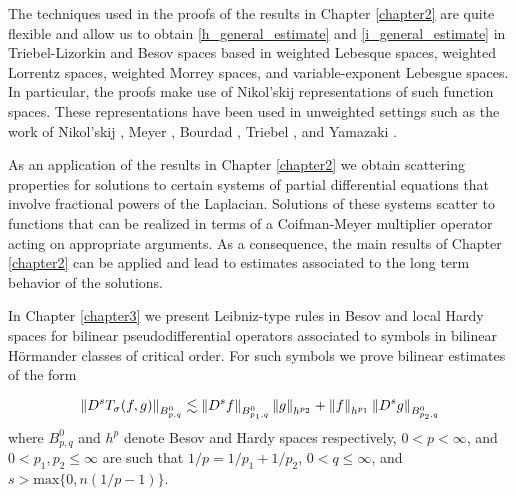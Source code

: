 The techniques used in the proofs of the results in Chapter \ref{chapter2} are quite flexible and allow us to obtain \eqref{h_general_estimate} and \eqref{i_general_estimate} in Triebel-Lizorkin and Besov spaces based in weighted Lebesque spaces, weighted Lorrentz spaces, weighted Morrey spaces, and variable-exponent Lebesgue spaces.
In particular, the proofs make use of Nikol'skij representations of such function spaces. These representations have been used in unweighted settings such as the work of Nikol'skij \citep{MR0374877}, Meyer \citep{MR639462}, Bourdad \citep{MR673825}, Triebel \citep{MR3024598}, and Yamazaki \citep{MR837335}. 

As an application of the results in Chapter \ref{chapter2} we obtain scattering properties for solutions to certain systems of partial differential equations that involve fractional powers of the Laplacian. Solutions of these systems scatter to functions that can be realized in terms of a Coifman-Meyer multiplier operator acting on appropriate arguments. As a consequence, the main results of Chapter \ref{chapter2} can be applied and lead to estimates associated to the long term behavior of the solutions. 

In Chapter \ref{chapter3} we present Leibniz-type rules in Besov and local Hardy spaces for bilinear pseudodifferential operators associated to symbols in bilinear H\"ormander classes of critical order. For such symbols we prove bilinear estimates of the form 

\begin{equation}
\left\|D^s T_\sigma(f,g)\right\|_{B^0_{p,q}} \lesssim \left\|D^s f\right\|_{B^0_{p_1,q}} \left\|g\right\|_{h^{p_2}} + \left\|f\right\|_{h^{p_1}}\left\|D^s g\right\|_{B^0_{p_2,q}}
\end{equation}
where $B^0_{p,q}$ and $h^p$ denote Besov and Hardy spaces respectively, $0<p<\infty$, and $0<p_1,p_2\leq\infty$ are such that $1/p = 1/p_1 + 1/p_2$, $0<q\leq\infty$, and $s>\text{max}\{0,n(1/p - 1)\}$.


